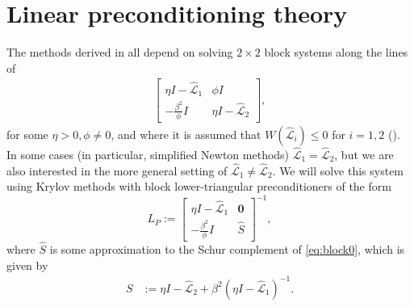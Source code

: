 \documentclass[review]{siamart}
\begin{document}
\section{Linear preconditioning theory}\label{sec:theory}

The methods derived in  all depend on
solving $2\times 2$ block systems along the lines of
%
\begin{align}\label{eq:block0}
\begin{bmatrix} \eta I - \widehat{\mathcal{L}}_1 & \phi I\\
-\frac{\beta^2}{\phi} I & \eta I - \widehat{\mathcal{L}}_2\end{bmatrix},
\end{align}
%
for some $\eta > 0, \phi \neq 0$, and where it is assumed that
$W(\widehat{\mathcal{L}}_i) \leq 0$ for $i=1,2$ (). In some
cases (in particular, simplified Newton methods) $\widehat{\mathcal{L}}_1 =
\widehat{\mathcal{L}}_2$, but we are also interested in the more general
setting of $\widehat{\mathcal{L}}_1 \neq \widehat{\mathcal{L}}_2$. We will solve
this system using Krylov methods with block lower-triangular preconditioners
of the form
%
\begin{equation}\label{eq:Lprec}
L_P := \begin{bmatrix} \eta I - \widehat{\mathcal{L}}_1 & \mathbf{0} \\ -\frac{\beta^2}{\phi} I
	& \widehat{S}\end{bmatrix}^{-1},
\end{equation}
%
where $\widehat{S}$ is some approximation to the Schur complement of \eqref{eq:block0},
which is given by
%
\begin{align}\label{eq:Schur}
S & := \eta I - \widehat{\mathcal{L}}_2 + \beta^2 (\eta I - \widehat{\mathcal{L}}_1)^{-1}.
\end{align}
%
\end{document}
